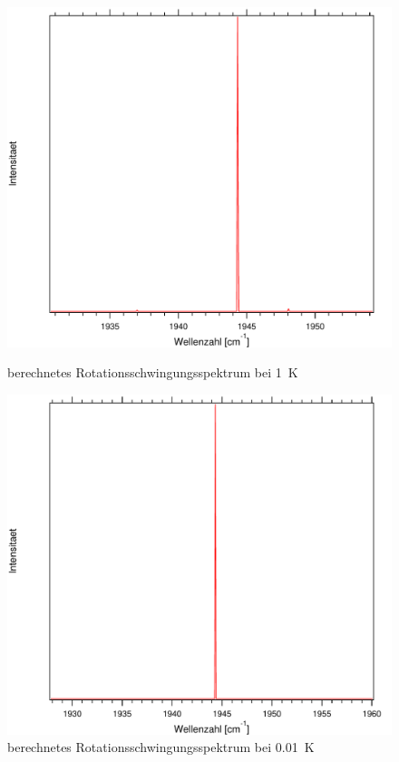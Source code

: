 \begin{figure}[H]
\centering	
	\begin{minipage}{0.47\linewidth}
	\includegraphics[width=\linewidth]{Bilder/1CO.pdf}
	\caption{berechnetes Rotationsschwingungsspektrum bei 1~K}
	\end{minipage}
\begin{minipage}{0.47\linewidth}
	\includegraphics[width=\linewidth]{Bilder/001CO.pdf}
	\caption{berechnetes Rotationsschwingungsspektrum bei 0.01~K}
	\label{Rot:001CO}
	\end{minipage}
	
	
	
	
	
\end{figure}





